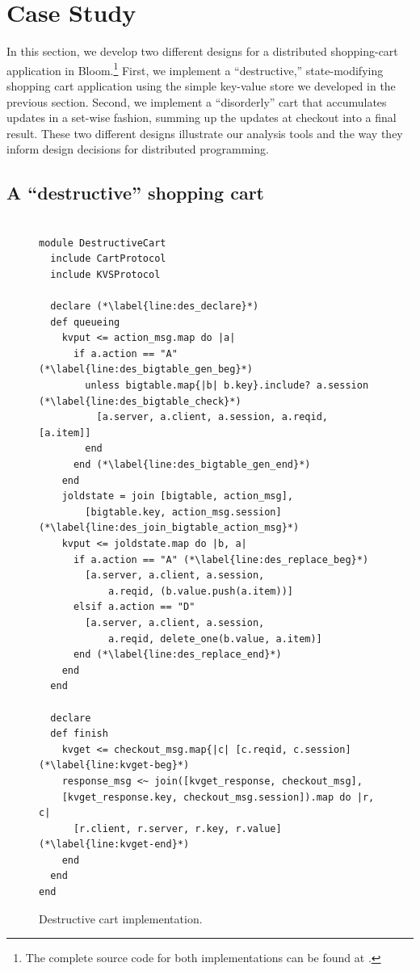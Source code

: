 \section{Case Study}
\label{sec:case}


In this section, we develop two different designs for a distributed shopping-cart
application in Bloom.\footnote{The complete source code for 
both implementations can be found at .}
First, we implement a ``destructive,'' state-modifying
shopping cart application using the simple key-value store we developed in the
previous section.
Second, we implement a ``disorderly'' cart that accumulates updates in a 
set-wise fashion, summing up the updates at checkout into a final result.  These two different designs illustrate our analysis tools and the way they inform design decisions for distributed programming.  

\subsection{A ``destructive'' shopping cart}

\begin{figure}[t]
\begin{scriptsize}
\begin{lstlisting}

module DestructiveCart
  include CartProtocol
  include KVSProtocol

  declare (*\label{line:des_declare}*)
  def queueing
    kvput <= action_msg.map do |a|
      if a.action == "A" (*\label{line:des_bigtable_gen_beg}*)
        unless bigtable.map{|b| b.key}.include? a.session (*\label{line:des_bigtable_check}*)
          [a.server, a.client, a.session, a.reqid, [a.item]]
        end
      end (*\label{line:des_bigtable_gen_end}*)
    end
    joldstate = join [bigtable, action_msg],
        [bigtable.key, action_msg.session]  (*\label{line:des_join_bigtable_action_msg}*)
    kvput <= joldstate.map do |b, a|
      if a.action == "A" (*\label{line:des_replace_beg}*)
        [a.server, a.client, a.session, 
            a.reqid, (b.value.push(a.item))]
      elsif a.action == "D"
        [a.server, a.client, a.session, 
            a.reqid, delete_one(b.value, a.item)]
      end (*\label{line:des_replace_end}*)
    end
  end

  declare
  def finish
    kvget <= checkout_msg.map{|c| [c.reqid, c.session] (*\label{line:kvget-beg}*)
    response_msg <~ join([kvget_response, checkout_msg],
    [kvget_response.key, checkout_msg.session]).map do |r, c|
      [r.client, r.server, r.key, r.value] (*\label{line:kvget-end}*)
    end
  end
end
\end{lstlisting}
\vspace{-10pt}
\caption{Destructive cart implementation.}
\label{fig:dest-cart}
\end{scriptsize}
\vspace{-2pt}
\end{figure}

